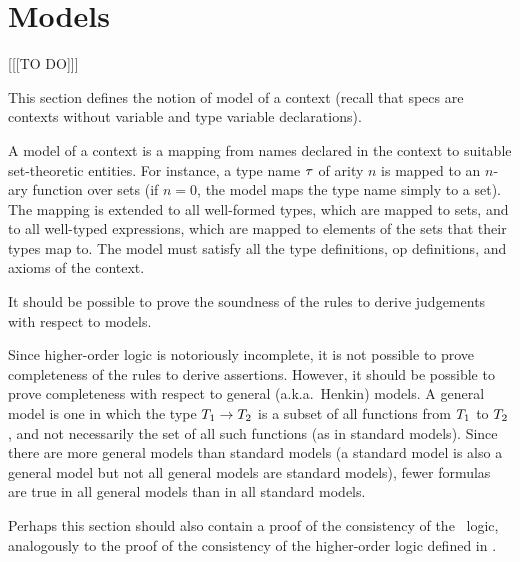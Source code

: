 \section{Models}
\label{models}

[[[TO DO]]]

This section defines the notion of model of a context (recall that specs are
contexts without variable and type variable declarations).

A model of a context is a mapping from names declared in the context to
suitable set-theoretic entities. For instance, a type name $\tau$ of arity
$n$ is mapped to an $n$-ary function over sets (if $n=0$, the model maps the
type name simply to a set). The mapping is extended to all well-formed types,
which are mapped to sets, and to all well-typed expressions, which are mapped
to elements of the sets that their types map to. The model must satisfy all
the type definitions, op definitions, and axioms of the context.

It should be possible to prove the soundness of the rules to derive judgements
with respect to models.

Since higher-order logic is notoriously incomplete, it is not possible to
prove completeness of the rules to derive assertions. However, it should be
possible to prove completeness with respect to general (a.k.a.\ Henkin)
models. A general model is one in which the type $T_1\to T_2$ is a subset of all
functions from $T_1$ to $T_2$, and not necessarily the set of all such
functions (as in standard models). Since there are more general models than
standard models (a standard model is also a general model but not all general
models are standard models), fewer formulas are true in all general models
than in all standard models.

Perhaps this section should also contain a proof of the consistency of the
\MS\ logic, analogously to the proof of the consistency of the higher-order
logic defined in \cite{andrews}.
